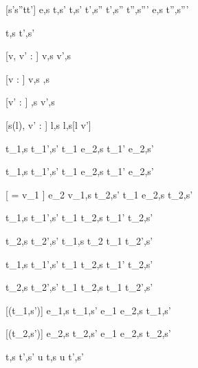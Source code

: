 [s'\neq s''\vee t\neq t']
    {e,s \evaluate t,s'  \Quad
     t,s' \stride t',s''  \Quad
     t',s'' \normalise t'',s'''}
    {e,s \normalise t'',s'''}





  {t,s  t',s'}

[v, v' : \tau]
  { }
  {\Edit v,s  \Edit v',s}

[v : \tau]
  { }
  {\Edit v,s \handle{\Empty} \Enter \tau,s}

[v' : \tau]
  { }
  {\Enter \tau,s  \Edit v',s}

[s(l), v' : \tau]
  { }
  {\Update l,s  \Update l,s[l \mapsto v']{}}


  {t_1,s  t_1',s'}
  {t_1 \Then e_2,s  t_1' \Then e_2,s'}

  {t_1,s  t_1',s'}
  {t_1 \Next e_2,s  t_1' \Next e_2,s'}

[ = v_1 \wedge \neg{}]
  {e_2 v_1,s \normalise t_2,s'}
  {t_1 \Next e_2,s \handle{\Continue} t_2,s'}


  {t_1,s  t_1',s' }
  {t_1 \And t_2,s  t_1' \And t_2,s'}

  {t_2,s  t_2',s'}
  {t_1,s \And t_2  t_1 \And t_2',s'}


  {t_1,s  t_1',s'}
  {t_1 \Or t_2,s  t_1' \Or t_2,s'}

  {t_2,s  t_2',s' }
  {t_1 \Or t_2,s  t_1 \Or t_2',s'}


[\neg\Failing(t_1,s')]
  {e_1,s \normalise t_1,s'}
  {e_1 \Xor e_2,s \handle{\Left} t_1,s'}

[\neg\Failing(t_2,s')]
  {e_2,s \normalise t_2,s'}
  {e_1 \Xor e_2,s \handle{\Right} t_2,s'}


  {t,s  t',s'}
  {u \At t,s u \At t',s'}






